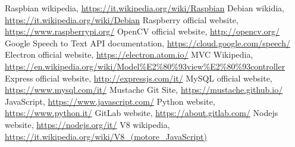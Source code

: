 \begin{thebibliography}{99}
\raggedright
 Raspbian wikipedia, \url{https://it.wikipedia.org/wiki/Raspbian}
 Debian wikidia, \url{https://it.wikipedia.org/wiki/Debian}
 Raspberry official website, \url{https://www.raspberrypi.org/}
 OpenCV official website, \url{http://opencv.org/}
 Google Speech to Text API documentation, \url{https://cloud.google.com/speech/}
 Electron official website, \url{https://electron.atom.io/}
 MVC Wikipedia, \url{https://en.wikipedia.org/wiki/Model%E2%80%93view%E2%80%93controller}
 Express official website, \url{http://expressjs.com/it/}
 MySQL official website, \url{https://www.mysql.com/it/}
 Mustache Git Site, \url{https://mustache.github.io/}
 JavaScript, \url{https://www.javascript.com/}
 Python website, \url{https://www.python.it/}
 GitLab website, \url{https://about.gitlab.com/}
 Nodejs website, \url{https://nodejs.org/it/}
 V8 wikipedia, \url{https://it.wikipedia.org/wiki/V8_(motore_JavaScript)}

\end{thebibliography}
